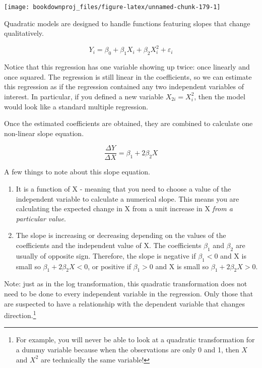 \documentclass[
]{book}
\begin{document}
\begin{center}\texttt{[image: bookdownproj\_files/figure-latex/unnamed-chunk-179-1]} \end{center}

Quadratic models are designed to handle functions featuring slopes that change qualitatively.

\[Y_i = \beta_0 + \beta_1 X_i + \beta_2 X_i^2 + \varepsilon_i\]

Notice that this regression has one variable showing up twice: once linearly and once squared. The regression is still linear in the coefficients, so we can estimate this regression as if the regression contained any two independent variables of interest. In particular, if you defined a new variable \(X_{2i} = X_i^2\), then the model would look like a standard multiple regression.

Once the estimated coefficients are obtained, they are combined to calculate one non-linear slope equation.

\[\frac{\Delta Y}{\Delta X} = \beta_1 + 2\beta_2  X\]

A few things to note about this slope equation.

\begin{enumerate}
\def\labelenumi{\arabic{enumi}.}
\item
  It is a function of X - meaning that you need to choose a value of the independent variable to calculate a numerical slope. This means you are calculating the expected change in X from a unit increase in X \emph{from a particular value}.
\item
  The slope is increasing or decreasing depending on the values of the coefficients and the independent value of X. The coefficients \(\beta_1\) and \(\beta_2\) are usually of opposite sign. Therefore, the slope is negative if \(\beta_1<0\) and X is small so \(\beta_1 + 2\beta_2 X<0\), or positive if \(\beta_1>0\) and X is small so \(\beta_1 + 2\beta_2 X>0\).
\end{enumerate}

Note: just as in the log transformation, this quadratic transformation does not need to be done to every independent variable in the regression. Only those that are suspected to have a relationship with the dependent variable that changes direction.\footnote{For example, you will never be able to look at a quadratic transformation for a dummy variable because when the observations are only 0 and 1, then \(X\) and \(X^2\) are technically the same variable!}
\end{document}
